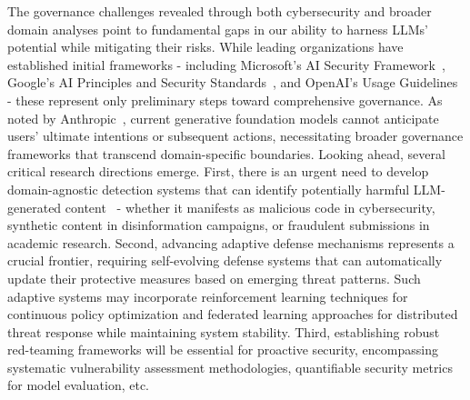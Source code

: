 The governance challenges revealed through both cybersecurity and broader domain analyses point to fundamental gaps in our ability to harness LLMs' potential while mitigating their risks. While leading organizations have established initial frameworks - including Microsoft's AI Security Framework~\cite{microsoft2023ai}, Google's AI Principles and Security Standards~\cite{google2023responsible}, and OpenAI's Usage Guidelines~\cite{openai2023usage} - these represent only preliminary steps toward comprehensive governance. As noted by Anthropic~\cite{anthropic2023responsible}, current generative foundation models cannot anticipate users' ultimate intentions or subsequent actions, necessitating broader governance frameworks that transcend domain-specific boundaries. Looking ahead, several critical research directions emerge. First, there is an urgent need to develop domain-agnostic detection systems that can identify potentially harmful LLM-generated content~\cite{wu2023survey, rieck2007language} - whether it manifests as malicious code in cybersecurity, synthetic content in disinformation campaigns, or fraudulent submissions in academic research. Second, advancing adaptive defense mechanisms represents a crucial frontier, requiring self-evolving defense systems that can automatically update their protective measures based on emerging threat patterns. Such adaptive systems may incorporate reinforcement learning techniques for continuous policy optimization and federated learning approaches for distributed threat response while maintaining system stability. Third, establishing robust red-teaming frameworks will be essential for proactive security, encompassing systematic vulnerability assessment methodologies, quantifiable security metrics for model evaluation, etc.




